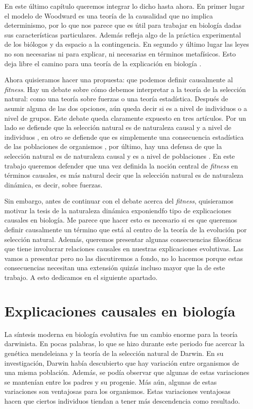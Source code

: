 En este último capítulo queremos integrar lo dicho hasta ahora. En primer lugar el modelo de Woodward es una teoría de la causalidad que no implica determinismo, por lo que nos parece que es útil para trabajar en biología dadas sus características particulares. Además refleja algo de la práctica experimental de los biólogos y da espacio a la contingencia. En segundo y último lugar las leyes no son necesarias ni para explicar, ni necesarias en términos metafísicos. Esto deja libre el camino para una teoría de la explicación en biología \cite{Brandon1997}.

Ahora quisieramos hacer una propuesta: que podemos definir causalmente al \emph{fitness}. Hay un debate sobre cómo debemos interpretar a la teoría de la selección natural: como una teoría sobre fuerzas o una teoría estadística. Después de asumir alguna de las dos opciones, aún queda decir si es a nivel de individuos o a nivel de grupos. Este debate queda claramente expuesto en tres artículos. Por un lado se defiende que la selección natural es de naturaleza causal y a nivel de individuos \cite{Bouchard2004}, en otro se defiende que es simplemente una consecuencia estadística de las poblaciones de organismos \cite{Walsh2002}, por último, hay una defensa de que la selección natural es de naturaleza causal y es a nivel de poblaciones \cite{Millstein2006}. En este trabajo queremos defender que una vez definida la noción central de \emph{fitness} en términos causales, es más natural decir que la selección natural es de naturaleza dinámica, es decir, sobre fuerzas.

Sin embargo, antes de continuar con el debate acerca del \emph{fitness}, quisieramos motivar la tesis de la naturaleza dinámica exponiendfo tipo de explicaciones causales en biología. Me parece que hacer esto es necesario si es que queremos definir causalmente un término que está al centro de la teoría de la evolución por selección natural. Además, queremos presentar algunas consecuencias filosóficas que tiene involucrar relaciones causales en nuestras explicaciones evolutivas. Las vamos a presentar pero no las discutiremos a fondo, no lo hacemos porque estas consecuencias necesitan una extensión quizás incluso mayor que la de este trabajo. A esto dedicamos en el siguiente apartado.

\section{Explicaciones causales en biología}

\noindent La síntesis moderna en biología evolutiva fue un cambio enorme para la teoría darwinista. En pocas palabras, lo que se hizo durante este periodo fue acercar la genética mendeleiana y la teoría de la selección natural de Darwin. En su investigación, Darwin había descubierto que hay variación entre organismos de una misma población. Además, se podía observar que algunas de estas variaciones se mantenían entre los padres y su progenie. Más aún, algunas de estas variaciones son ventajosas para los organismos. Estas variaciones ventajosas hacen que ciertos individuos tiendan a tener más descendencia como resultado.

